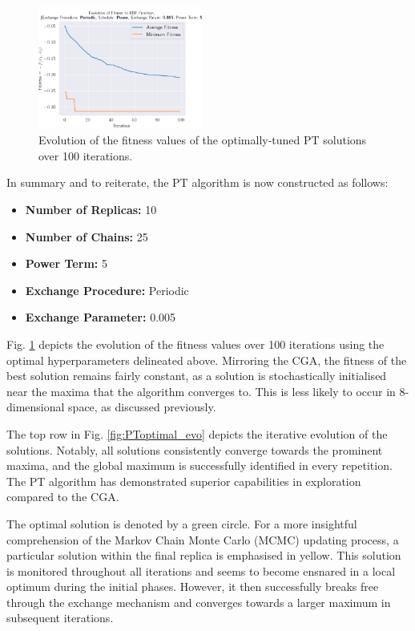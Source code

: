 \documentclass[10pt]{article}
\begin{document}
\begin{multicols}{2}
\begin{figure}[H]
    \centering
    \includegraphics[width=0.48\textwidth]{../figures/Permanent Images/0.005_5_Periodic_Fitness.png}
    \captionsetup{justification=centering}
    \caption{Evolution of the fitness values of the optimally-tuned PT solutions over 100 iterations.}
    \label{fig:PToptimal_fitness}
\end{figure}

In summary and to reiterate, the PT algorithm is now constructed as follows:

\begin{itemize}
    \item \textbf{Number of Replicas:} 10
    \item \textbf{Number of Chains:} 25
    \item \textbf{Power Term:} 5
    \item \textbf{Exchange Procedure:} Periodic
    \item \textbf{Exchange Parameter:} 0.005
\end{itemize}

Fig. \ref{fig:PToptimal_fitness} depicts the evolution of the fitness values over 100 iterations using the optimal hyperparameters delineated above. Mirroring the CGA, the fitness of the best solution remains fairly constant, as a solution is stochastically initialised near the maxima that the algorithm converges to. This is less likely to occur in 8-dimensional space, as discussed previously.

The top row in Fig. \ref{fig:PToptimal_evo} depicts the iterative evolution of the solutions. Notably, all solutions consistently converge towards the prominent maxima, and the global maximum is successfully identified in every repetition. The PT algorithm has demonstrated superior capabilities in exploration compared to the CGA.

The optimal solution is denoted by a green circle. For a more insightful comprehension of the Markov Chain Monte Carlo (MCMC) updating process, a particular solution within the final replica is emphasised in yellow. This solution is monitored throughout all iterations and seems to become ensnared in a local optimum during the initial phases. However, it then successfully breaks free through the exchange mechanism and converges towards a larger maximum in subsequent iterations.


\end{multicols}
\end{document}
